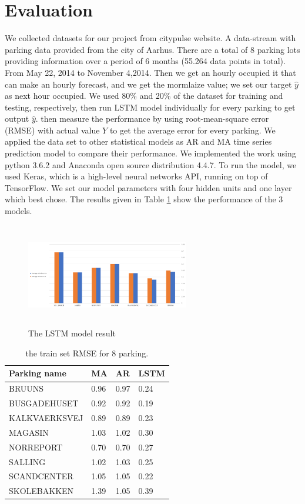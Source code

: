 \documentclass[10pt, conference, compsocconf]{IEEEtran}
\begin{document}
\section{Evaluation}
We collected datasets for our project from citypulse website. A data-stream with parking data provided from the city of Aarhus. There are a total of 8 parking lots providing information over a period of 6 months (55.264 data points in total). From May 22, 2014 to November 4,2014. Then we get an hourly occupied it that can make an hourly forecast, and  we get the  mormlaize value; we set our target $\hat y$ as next hour occupied. We used 80\% and 20\% of the dataset for training and testing, respectively, then run LSTM model individually for every parking to get output $\hat y $.  then measure the performance by using root-mean-square error (RMSE) with actual value \(Y\) to get the average error for every parking. We applied the data set to other statistical models as AR and MA time series prediction model to compare their performance. 
We implemented the work using python 3.6.2 and Anaconda open source distribution 4.4.7. To run the model, we used Keras, which is a high-level neural networks API, running on top of TensorFlow. We set our model parameters with four hidden units and one layer which best chose. The results given in Table \ref{table:1} show the  performance of the 3 models.
\begin{figure}[h]
 \includegraphics[width=7.1cm, height=4.5cm]{result}
 \caption{\footnotesize The LSTM model result}
 \label{fig:result}
\end{figure}
\begin{table}[h!]
\begin{tabular}{ | m{3cm} | m{1cm}| m{1cm} | m{1cm} | } 
\hline
Parking name & MA & AR& LSTM\\ 
\hline
BRUUNS& 0.96 & 0.97 &0.24\\ 
\hline
BUSGADEHUSET & 0.92 & 0.92&0.19 \\ 
\hline
KALKVAERKSVEJ & 0.89 & 0.89 &0.23\\ 
\hline
MAGASIN & 1.03 & 1.02& 0.30\\ 
\hline
NORREPORT & 0.70 &0.70 &0.27\\ 
\hline
SALLING & 1.02 & 1.03&0.25\\ 
\hline
SCANDCENTER & 1.05 & 1.05& 0.22\\ 
\hline
SKOLEBAKKEN & 1.39 & 1.05& 0.39\\ 
\hline
\end{tabular}

\caption{\footnotesize the train set RMSE for 8 parking.}
\label{table:1}
\end{table}
\end{document}
